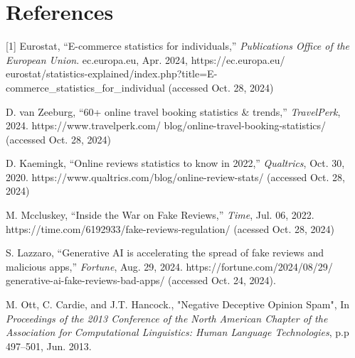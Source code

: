 \documentclass[a4paper,11pt]{article}
\begin{document}
\section*{References}


[1] Eurostat, “E-commerce statistics for individuals,” \textit{Publications Office of the European Union}. ec.europa.eu, Apr. 2024, https://ec.europa.eu/
eurostat/statistics-explained/index.php?title=E-commerce\_statistics\_for\_individual 
(accessed Oct. 28, 2024)

\hfill

\noindent [2] D. van Zeeburg, “60+ online travel booking statistics \& trends,” \textit{TravelPerk}, 2024. https://www.travelperk.com/
blog/online-travel-booking-statistics/
(accessed Oct. 28, 2024)

\hfill

\noindent [3] D. Kaemingk, “Online reviews statistics to know in 2022,” \textit{Qualtrics}, Oct. 30, 2020. https://www.qualtrics.com/blog/online-review-stats/ (accessed Oct. 28, 2024)

\hfill

\noindent M. Mccluskey, “Inside the War on Fake Reviews,” \textit{Time}, Jul. 06, 2022. https://time.com/6192933/fake-reviews-regulation/ (acessed Oct. 28, 2024)

\hfill

\noindent [5] S. Lazzaro, “Generative AI is accelerating the spread of fake reviews and malicious apps,” \textit{Fortune}, Aug. 29, 2024. https://fortune.com/2024/08/29/
generative-ai-fake-reviews-bad-apps/ (accessed Oct. 24, 2024).

\hfill

\noindent [6] M. Ott, C. Cardie, and J.T. Hancock., "Negative Deceptive Opinion Spam", In \textit{Proceedings of the 2013 Conference of the North American Chapter of the Association for Computational Linguistics: Human Language Technologies}, p.p 497–501, Jun. 2013.  
\hfill
\end{document}
